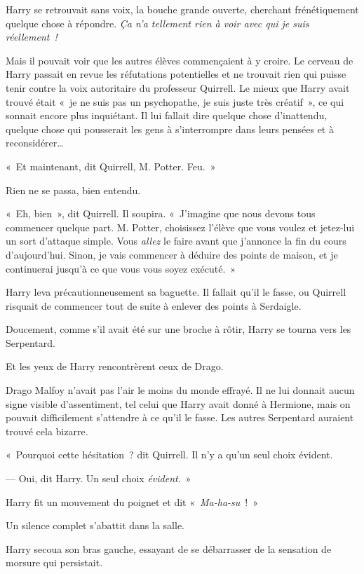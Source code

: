Harry se retrouvait sans voix, la bouche grande ouverte, cherchant frénétiquement quelque chose à répondre.
\emph{Ça n'a tellement rien à voir avec qui je suis réellement~!}

Mais il pouvait voir que les autres élèves commençaient à y croire.
Le cerveau de Harry passait en revue les réfutations potentielles et ne trouvait rien qui puisse tenir contre la voix autoritaire du professeur Quirrell.
Le mieux que Harry avait trouvé était «~je ne suis pas un psychopathe, je suis juste très créatif~», ce qui sonnait encore plus inquiétant.
Il lui fallait dire quelque chose d'inattendu, quelque chose qui pousserait les gens à s'interrompre dans leurs pensées et à reconsidérer…

«~Et maintenant, dit Quirrell, M. Potter. Feu.~»

Rien ne se passa, bien entendu.

«~Eh, bien~», dit Quirrell. Il soupira.
«~J'imagine que nous devons tous commencer quelque part.
M. Potter, choisissez l'élève que vous voulez et jetez-lui un sort d'attaque simple.
Vous \emph{allez} le faire avant que j'annonce la fin du cours d'aujourd'hui.
Sinon, je vais commencer à déduire des points de maison, et je continuerai jusqu'à ce que vous vous soyez exécuté.~»

Harry leva précautionneusement sa baguette.
Il fallait qu'il le fasse, ou Quirrell risquait de commencer tout de suite à enlever des points à Serdaigle.

Doucement, comme s'il avait été sur une broche à rôtir, Harry se tourna vers les Serpentard.

Et les yeux de Harry rencontrèrent ceux de Drago.

Drago Malfoy n'avait pas l'air le moins du monde effrayé.
Il ne lui donnait aucun signe visible d'assentiment, tel celui que Harry avait donné à Hermione, mais on pouvait difficilement s'attendre à ce qu'il le fasse.
Les autres Serpentard auraient trouvé cela bizarre.

«~Pourquoi cette hésitation~? dit Quirrell. Il n'y a qu'un seul choix évident.

--- Oui, dit Harry. Un seul choix \emph{évident}.~»

Harry fit un mouvement du poignet et dit «~\emph{Ma-ha-su}~!~»

Un silence complet s'abattit dans la salle.

Harry secoua son bras gauche, essayant de se débarrasser de la sensation de morsure qui persistait.


